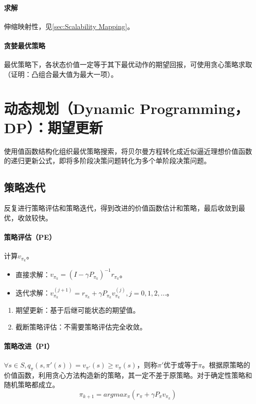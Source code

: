 \documentclass[
12pt, %
a4paper, 
oneside, %
headinclude,footinclude, %
]{scrartcl}
\begin{document}
\paragraph{求解}
伸缩映射性，见\ref{sec:Scalability Mapping}。\label{sec:Scalability Mapping back}
\paragraph{贪婪最优策略}
最优策略下，各状态价值一定等于其下最优动作的期望回报，可使用贪心策略求取（证明：凸组合最大值为最大一项）。
\section{动态规划（Dynamic Programming，DP）：期望更新}
使用值函数结构化组织最优策略搜索，将贝尔曼方程转化成近似逼近理想价值函数的递归更新公式，即将多阶段决策问题转化为多个单阶段决策问题。
\subsection{策略迭代}
反复进行策略评估和策略迭代，得到改进的价值函数估计和策略，最后收敛到最优，收敛较快。
\paragraph{策略评估（PE）}
计算$ v_{\pi_k} $。
\begin{itemize}
\item 直接求解：$ v_{\pi_k} = (I - \gamma P_{\pi_k})^{-1} r_{\pi_k} $。
\item 迭代求解：$ v_{\pi_k}^{(j + 1)} = r_{\pi_k} + \gamma P_{\pi_k} v_{\pi_k}^{(j)}, j = 0, 1, 2, \dots $。
\end{itemize}
\begin{enumerate}
\item 期望更新：基于后继可能状态的期望值。
\item 截断策略评估：不需要策略评估完全收敛。
\end{enumerate}
\paragraph{策略改进（PI）}
$ \forall s \in S, q_{\pi}(s, \pi'(s)) = v_{\pi'}(s) \geq v_{\pi}(s) $，则称$ \pi' $优于或等于$ \pi $。根据原策略的价值函数，利用贪心方法构造新的策略，其一定不差于原策略。对于确定性策略和随机策略都成立。
$$ \pi_{k + 1} = argmax_{\pi}(r_{\pi} + \gamma P_{\pi}v_{\pi_k}) $$
\end{document}
